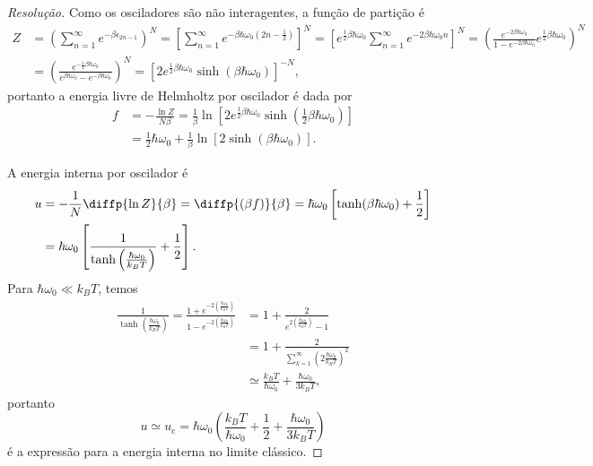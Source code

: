 \begin{proof}[Resolução]
    Como os osciladores são não interagentes, a função de partição é
    \begin{align*}
        Z &= \left(\sum_{n = 1}^\infty e^{-\beta\epsilon_{2n-1}}\right)^N = \left[\sum_{n=1}^\infty e^{-\beta \hbar \omega_0\left(2n - \frac12\right)}\right]^N = \left[e^{\frac12\beta \hbar \omega_0} \sum_{n=1}^\infty e^{-2\beta \hbar \omega_0 n}\right]^N = \left(\frac{e^{- 2\beta \hbar \omega_0}}{1 - e^{-2\beta \hbar \omega_0}} e^{\frac12 \beta \hbar \omega_0}\right)^N\\
          &= \left(\frac{e^{-\frac12\beta \hbar \omega_0}}{e^{\beta \hbar \omega_0} - e^{-\beta \hbar \omega_0}}\right)^N = \left[2e^{\frac12 \beta \hbar \omega_0}\sinh\left(\beta\hbar \omega_0\right)\right]^{-N},
    \end{align*}
    portanto a energia livre de Helmholtz por oscilador é dada por
    \begin{align*}
        f &= -\frac{\ln Z}{N \beta} = \frac{1}{\beta} \ln \left[2 e^{\frac12 \beta \hbar \omega_0}\sinh\left(\frac12\beta \hbar \omega_0\right)\right]\\
          &=  \frac 12 \hbar \omega_0 + \frac1\beta \ln\left[2\sinh(\beta \hbar \omega_0)\right].
    \end{align*}

    A energia interna por oscilador é
    \begin{align*}
        u &= -\frac1N \diffp{\ln Z}{\beta} = \diffp{(\beta f)}{\beta}= \hbar\omega_0\left[\tanh(\beta \hbar \omega_0)+\frac12 \right]\\
          &= \hbar \omega_0 \left[\frac{1}{\tanh\left(\frac{\hbar \omega_0}{k_B T}\right)} + \frac12\right].
    \end{align*}
    Para \(\hbar \omega_0 \ll k_B T\), temos
    \begin{align*}
        \frac{1}{\tanh\left(\frac{\hbar \omega_0}{k_B T}\right)} = \frac{1 + e^{-2\left(\frac{\hbar \omega_0}{k_B T}\right)}}{1 - e^{-2\left(\frac{\hbar \omega_0}{k_B T}\right)}}
                                                                 &= 1 + \frac2{e^{2\left(\frac{\hbar \omega_0}{k_B T}\right)} - 1}\\
                                                                 &= 1 + \frac2{\sum_{k = 1}^\infty \left(2\frac{\hbar \omega_0}{k_B T}\right)^2}\\
                                                                 &\simeq \frac{k_B T}{\hbar \omega_0} + \frac{\hbar \omega_0}{3k_B T},
    \end{align*}
    portanto
    \begin{equation*}
        u \simeq u_\mathrm{c} = \hbar \omega_0 \left(\frac{k_B T}{\hbar\omega_0} + \frac{1}{2} + \frac{\hbar \omega_0}{3 k_B T}\right)
    \end{equation*}
    é a expressão para a energia interna no limite clássico.


\end{proof}
